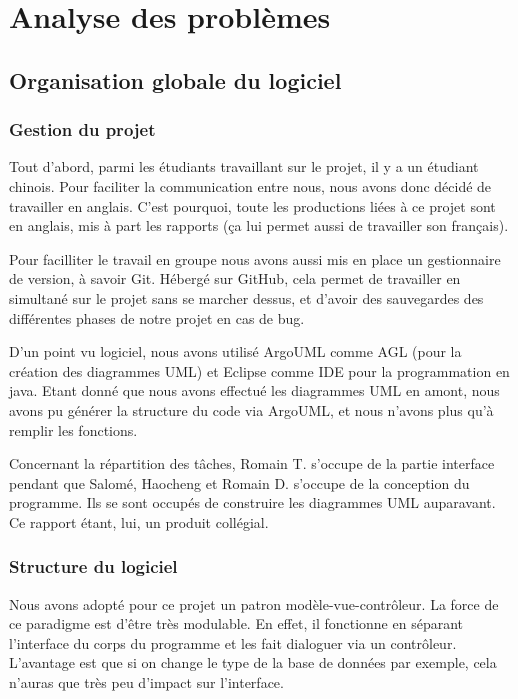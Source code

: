 \documentclass[11pt]{report}
\begin{document}
\chapter{Analyse des problèmes}

	\section{Organisation globale du logiciel}

		\subsection{Gestion du projet}
			Tout d'abord, parmi les étudiants travaillant sur le projet, il y a un étudiant chinois. Pour faciliter la communication entre nous, nous avons donc décidé de travailler en anglais. C'est pourquoi, toute les productions liées à ce projet sont en anglais, mis à part les rapports (ça lui permet aussi de travailler son français). 
			
			Pour facilliter le travail en groupe nous avons aussi mis en place un gestionnaire de version, à savoir Git. Hébergé sur GitHub\up{\copyright}, cela permet de travailler en simultané sur le projet sans se marcher dessus, et d'avoir des sauvegardes des différentes phases de notre projet en cas de bug.
			
			D'un point vu logiciel, nous avons utilisé ArgoUML comme AGL (pour la création des diagrammes UML) et Eclipse comme IDE pour la programmation en java. Etant donné que nous avons effectué les diagrammes UML en amont, nous avons pu générer la structure du code via ArgoUML, et nous n'avons plus qu'à remplir les fonctions.
			
			Concernant la répartition des tâches, Romain T. s'occupe de la partie interface pendant que Salomé, Haocheng et Romain D. s'occupe de la conception du programme. Ils se sont occupés de construire les diagrammes UML auparavant. Ce rapport étant, lui, un produit collégial.
			
			
		\subsection{Structure du logiciel}
		
			Nous avons adopté pour ce projet un patron modèle-vue-contrôleur. La force de ce paradigme est d'être très modulable. En effet, il fonctionne en séparant l'interface du corps du programme et les fait dialoguer via un contrôleur. L'avantage est que si on change le type de la base de données par exemple, cela n'auras que très peu d'impact sur l'interface. 
			
\end{document}
